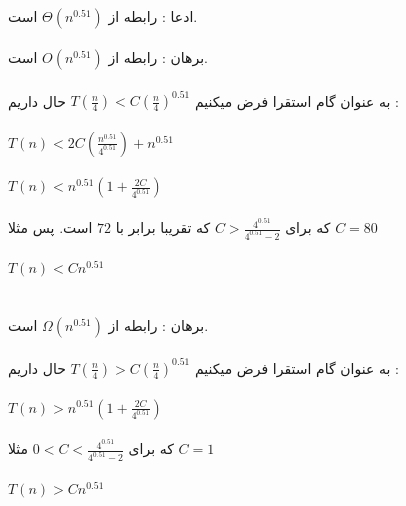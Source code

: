 \\
\subproblem{}
ادعا : رابطه از $\Theta(n^{0.51})$ است.\\\\
برهان : رابطه از $O(n^{0.51})$ است. \\\\
به عنوان گام استقرا فرض میکنیم $T(\frac{n}{4}) < C (\frac{n}{4})^{0.51}$ حال داریم : \\\\
$T(n) < 2C (\frac{n^{0.51}}{4^{0.51}}) + n^{0.51}$\\\\
$T(n) < n^{0.51}(1+\frac{2C}{4^{0.51}})$\\\\
که برای $C>\frac{4^{0.51}}{4^{0.51} - 2}$ که تقریبا برابر با $72$ است. پس مثلا $C = 80$\\\\
$T(n) < Cn^{0.51}$\\\\\\

برهان : رابطه از $\Omega(n^{0.51})$ است. \\\\
به عنوان گام استقرا فرض میکنیم $T(\frac{n}{4}) > C (\frac{n}{4})^{0.51}$ حال داریم : \\\\
$T(n) > n^{0.51}(1+\frac{2C}{4^{0.51}})$\\\\
که برای $0<C<\frac{4^{0.51}}{4^{0.51} - 2}$ مثلا $C = 1$\\\\
$T(n) > Cn^{0.51}$\\\\\\